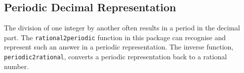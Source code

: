 \subsection{Periodic Decimal Representation}

The division of one integer by another often results in
a period in the decimal part. The \texttt{rational2periodic}
function in this package can recognise and represent
such an answer in a periodic representation. The inverse
function, \texttt{periodic2rational}, converts a
periodic representation back to a rational number.

\hypertarget{operator:RATIONAL2PERIODIC}{}
\hypertarget{operator:PERIODIC2RATIONAL}{}
\hypertarget{operator:PERIODIC}{}
